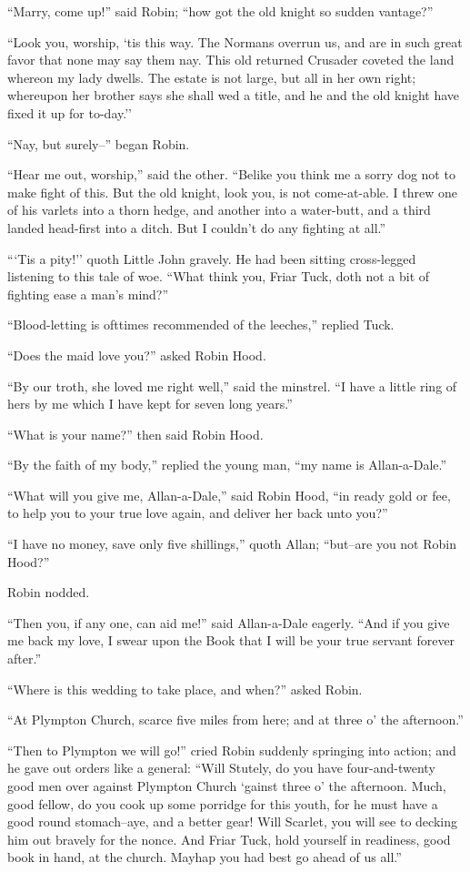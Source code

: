 ``Marry, come up!'' said Robin; ``how got the old knight so sudden
vantage?''

``Look you, worship, `tis this way. The Normans overrun us, and are in
such great favor that none may say them nay. This old returned Crusader
coveted the land whereon my lady dwells. The estate is not large, but
all in her own right; whereupon her brother says she shall wed a title,
and he and the old knight have fixed it up for to-day.''

``Nay, but surely--'' began Robin.

``Hear me out, worship,'' said the other. ``Belike you think me a sorry
dog not to make fight of this. But the old knight, look you, is not
come-at-able. I threw one of his varlets into a thorn hedge, and another
into a water-butt, and a third landed head-first into a ditch. But I
couldn't do any fighting at all.''

```Tis a pity!'' quoth Little John gravely. He had been sitting
cross-legged listening to this tale of woe. ``What think you, Friar
Tuck, doth not a bit of fighting ease a man's mind?''

``Blood-letting is ofttimes recommended of the leeches,'' replied Tuck.

``Does the maid love you?'' asked Robin Hood.

``By our troth, she loved me right well,'' said the minstrel. ``I have a
little ring of hers by me which I have kept for seven long years.''

``What is your name?'' then said Robin Hood.

``By the faith of my body,'' replied the young man, ``my name is
Allan-a-Dale.''

``What will you give me, Allan-a-Dale,'' said Robin Hood, ``in ready
gold or fee, to help you to your true love again, and deliver her back
unto you?''

``I have no money, save only five shillings,'' quoth Allan; ``but--are
you not Robin Hood?''

Robin nodded.

``Then you, if any one, can aid me!'' said Allan-a-Dale eagerly. ``And
if you give me back my love, I swear upon the Book that I will be your
true servant forever after.''

``Where is this wedding to take place, and when?'' asked Robin.

``At Plympton Church, scarce five miles from here; and at three o' the
afternoon.''

``Then to Plympton we will go!'' cried Robin suddenly springing into
action; and he gave out orders like a general: ``Will Stutely, do you
have four-and-twenty good men over against Plympton Church `gainst three
o' the afternoon. Much, good fellow, do you cook up some porridge for
this youth, for he must have a good round stomach--aye, and a better
gear! Will Scarlet, you will see to decking him out bravely for the
nonce. And Friar Tuck, hold yourself in readiness, good book in hand, at
the church. Mayhap you had best go ahead of us all.''

